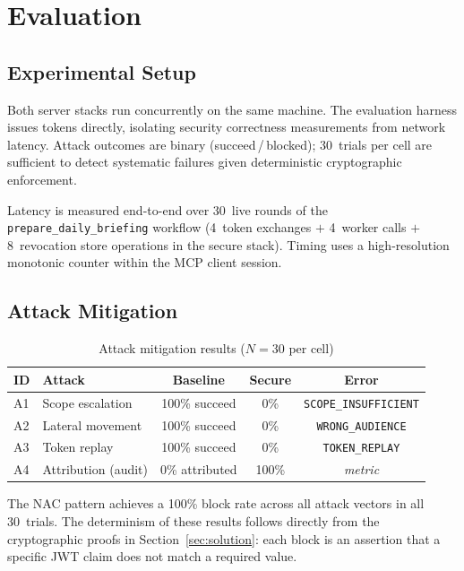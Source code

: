 \documentclass[journal]{IEEEtran}
\begin{document}
\section{Evaluation}
\label{sec:eval}

\subsection{Experimental Setup}

Both server stacks run concurrently on the same machine. The evaluation harness
issues tokens directly, isolating security correctness measurements from network
latency. Attack outcomes are binary (succeed\,/\,blocked); 30~trials per cell
are sufficient to detect systematic failures given deterministic cryptographic
enforcement.

Latency is measured end-to-end over 30~live rounds of the
\texttt{prepare\_daily\_briefing} workflow (4~token exchanges $+$ 4~worker
calls $+$ 8~revocation store operations in the secure stack). Timing uses a
high-resolution monotonic counter within the MCP client session.

\subsection{Attack Mitigation}

\begin{table}[h]
\caption{Attack mitigation results ($N=30$ per cell)}
\label{tab:attacks}
\centering
\footnotesize
\setlength{\tabcolsep}{4pt}
\begin{tabular}{llccc}
\toprule
\textbf{ID} & \textbf{Attack} & \textbf{Baseline} & \textbf{Secure} & \textbf{Error} \\
\midrule
A1 & Scope escalation    & 100\% succeed & 0\%  & \texttt{SCOPE\_INSUFFICIENT} \\
A2 & Lateral movement    & 100\% succeed & 0\%  & \texttt{WRONG\_AUDIENCE} \\
A3 & Token replay        & 100\% succeed & 0\%  & \texttt{TOKEN\_REPLAY} \\
A4 & Attribution (audit) & 0\% attributed & 100\% & \textit{metric} \\
\bottomrule
\end{tabular}
\end{table}

The NAC pattern achieves a 100\% block rate across all attack vectors in all
30~trials. The determinism of these results follows directly from the
cryptographic proofs in Section~\ref{sec:solution}: each block is an assertion
that a specific JWT claim does not match a required value.
\end{document}
